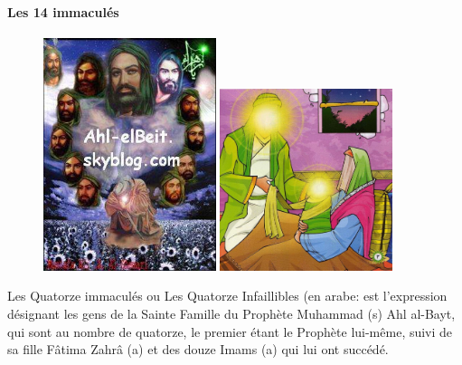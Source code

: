  \paragraph{Les 14 immaculés}
    \begin{figure}
     \centering
\includegraphics[width=0.45\textwidth]{CourantsIslamContemporain/ImagesCourantsIslamContemporain/Image3Chiisme.jpeg}
\includegraphics[width=0.45\textwidth]{CourantsIslamContemporain/ImagesCourantsIslamContemporain/image4.jpeg}
 \end{figure}
 
 
 \begin{Def}
 Les Quatorze immaculés ou Les Quatorze Infaillibles (en arabe: est l'expression désignant les gens de la Sainte Famille du Prophète Muhammad (s) Ahl al-Bayt, qui sont au nombre de quatorze, le premier étant le Prophète lui-même, suivi de sa fille Fâtima Zahrâ (a) et des douze Imams (a) qui lui ont succédé.
 \end{Def}
 
